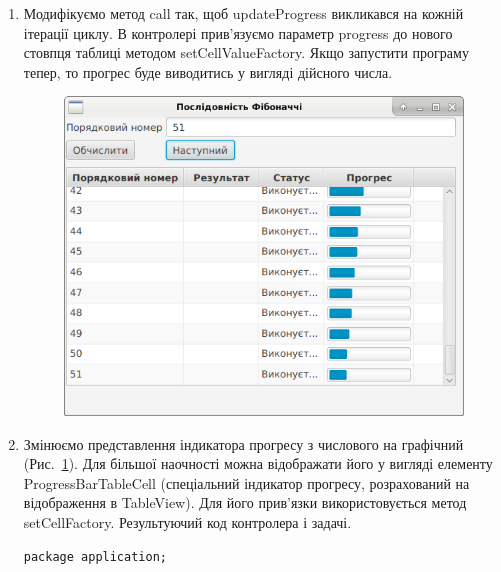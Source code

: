 \begin{enumerate}
	\item Модифікуємо метод call так, щоб updateProgress викликався на кожній ітерації циклу. 
В контролері прив'язуємо параметр progress до нового стовпця таблиці методом setCellValueFactory. Якщо запустити програму тепер, то прогрес буде виводитись у вигляді дійсного числа. 

	\begin{figure}[h]
		\includegraphics{chapter21/images/image6.png}
		\caption{}
		\label{fig:image6}
	\end{figure}

	\item Змінюємо представлення індикатора прогресу з числового на графічний (Рис.~\ref{fig:image6}).
Для більшої наочності можна відображати його у вигляді елементу ProgressBarTableCell (спеціальний індикатор прогресу, розрахований на відображення в TableView). Для його прив'язки використовується метод setCellFactory. Результуючий код контролера і задачі.

\begin{verbatim}
package application;


\end{verbatim}
\end{enumerate}
